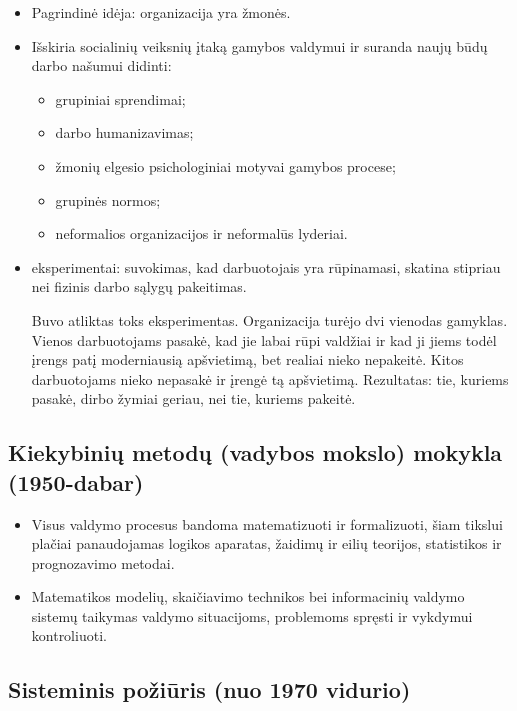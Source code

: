 \begin{itemize}
  \item Pagrindinė idėja: organizacija yra žmonės.
  \item Išskiria socialinių veiksnių įtaką gamybos valdymui ir suranda
    naujų būdų darbo našumui didinti:
    \begin{itemize}
      \item grupiniai sprendimai;
      \item darbo humanizavimas;
      \item žmonių elgesio psichologiniai motyvai gamybos procese;
      \item grupinės normos;
      \item neformalios organizacijos ir neformalūs lyderiai.
    \end{itemize}
  \item {} eksperimentai: suvokimas, kad
    darbuotojais yra rūpinamasi, skatina stipriau nei fizinis darbo
    sąlygų pakeitimas.

    \begin{note}
      Buvo atliktas toks eksperimentas. Organizacija turėjo dvi vienodas
      gamyklas. Vienos darbuotojams pasakė, kad jie labai rūpi valdžiai
      ir kad ji jiems todėl įrengs patį moderniausią apšvietimą, bet
      realiai nieko nepakeitė. Kitos darbuotojams nieko nepasakė ir
      įrengė tą apšvietimą. Rezultatas: tie, kuriems pasakė, dirbo
      žymiai geriau, nei tie, kuriems pakeitė.
    \end{note}
\end{itemize}

\subsection{Kiekybinių metodų (vadybos mokslo) mokykla (1950-dabar)}

\begin{itemize}
  \item Visus valdymo procesus bandoma matematizuoti ir formalizuoti,
    šiam tikslui plačiai panaudojamas logikos aparatas, žaidimų
    ir eilių teorijos, statistikos ir prognozavimo metodai.
  \item Matematikos modelių, skaičiavimo technikos bei informacinių
    valdymo sistemų taikymas valdymo situacijoms, problemoms spręsti
    ir vykdymui kontroliuoti.
\end{itemize}

\subsection{Sisteminis požiūris (nuo 1970 vidurio)}

